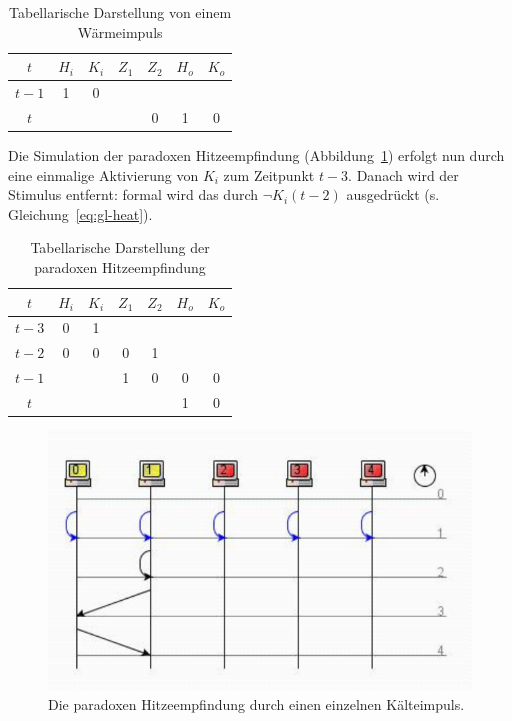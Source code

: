 \begin{table} %
    \centering
    \begin{tabular}{c | c | c | c | c | c | c}
        $t$   & $H_i$ & $K_i$ & $Z_1$ & $Z_2$ & $H_o$ & $K_o$ \\
        \hline
        $t-1$ & 1     & 0     &          &          &          &          \\
        $t$   &       &       &          & 0         & 1        & 0        \\
    \end{tabular}
    \caption{Tabellarische Darstellung von einem Wärmeimpuls}
    \label{tab:heatimp}
\end{table}



Die Simulation der paradoxen Hitzeempfindung (Abbildung~\ref{fig-heatparad}) erfolgt nun durch eine einmalige Aktivierung von $K_i$ zum Zeitpunkt $t-3$.
Danach wird der Stimulus entfernt: formal wird das durch $\neg K_i (t-2)$ ausgedrückt (s. Gleichung~\ref{eq:gl-heat}).

\begin{table} %
    \centering
    \begin{tabular}{c | c | c | c | c | c | c}
        $t$   & $H_i$ & $K_i$ & $Z_1$ & $Z_2$ & $H_o$ & $K_o$ \\
        \hline
        $t-3$   &  0  &  1  &    &    &    &  \\
        $t-2$   &  0  &  0  &  0  & 1   &    &  \\
        $t-1$   &    &    &   1 & 0   &  0  & 0 \\
        $t$   &    &    &    &    &  1  & 0 \\
    \end{tabular}
    \caption{Tabellarische Darstellung der paradoxen Hitzeempfindung}
    \label{tab:heatparad}
\end{table}

\begin{figure}[h]
    \centering
    \includegraphics{images/p1ReadSeq.pdf}
    \caption{Die paradoxen Hitzeempfindung durch einen einzelnen Kälteimpuls.}
    \label{fig-heatparad}
\end{figure}
